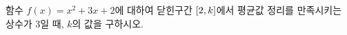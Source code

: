 함수 $f(x)=x^2+3x+2$에 대하여 닫힌구간 $[2{,}\mkern3mu\mathopen{}k]$에서 평균값 정리를 만족시키는 상수가 3일 때, $k$의 값을 구하시오. 
